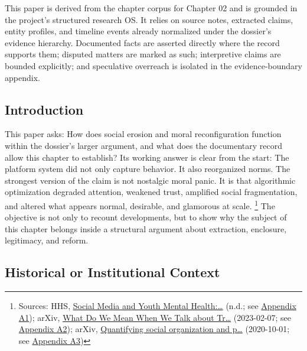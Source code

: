 \documentclass[
  american,
  11pt,
  letterpaper,
]{article}
\begin{document}
This paper is derived from the chapter corpus for Chapter 02 and is
grounded in the project's structured research OS. It relies on source
notes, extracted claims, entity profiles, and timeline events already
normalized under the dossier's evidence hierarchy. Documented facts are
asserted directly where the record supports them; disputed matters are
marked as such; interpretive claims are bounded explicitly; and
speculative overreach is isolated in the evidence-boundary appendix.

\subsection{Introduction}\label{introduction-2}

This paper asks: How does social erosion and moral reconfiguration
function within the dossier's larger argument, and what does the
documentary record allow this chapter to establish? Its working answer
is clear from the start: The platform system did not only capture
behavior. It also reorganized norms. The strongest version of the claim
is not nostalgic moral panic. It is that algorithmic optimization
degraded attention, weakened trust, amplified social fragmentation, and
altered what appears normal, desirable, and glamorous at scale.
\footnote{Sources: HHS,
  \href{https://www.hhs.gov/surgeongeneral/priorities/youth-mental-health/social-media/index.html}{Social
  Media and Youth Mental Health:\ldots{}} (n.d.; see
  \hyperref[ch-02-appendix-a1-social-media-and-youth-mental-health-the-u-s-surgeon-general-s-advisory]{Appendix
  A1}); arXiv, \href{https://arxiv.org/abs/2302.03671}{What Do We Mean
  When We Talk about Tr\ldots{}} (2023-02-07; see
  \hyperref[ch-02-appendix-a2-what-do-we-mean-when-we-talk-about-trust-in-social-media-a-systematic-review]{Appendix
  A2}); arXiv, \href{https://arxiv.org/abs/2010.00590}{Quantifying
  social organization and p\ldots{}} (2020-10-01; see
  \hyperref[ch-02-appendix-a3-quantifying-social-organization-and-political-polarization-in-online-platforms]{Appendix
  A3})} The objective is not only to recount developments, but to show
why the subject of this chapter belongs inside a structural argument
about extraction, enclosure, legitimacy, and reform.

\subsection{Historical or Institutional
Context}\label{historical-or-institutional-context-2}
\end{document}
